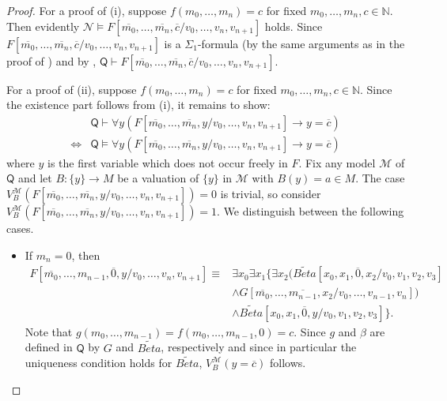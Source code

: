 \begin{proof}
For a proof of (i), suppose $f(m_0, \ldots, m_n) = c$ for fixed $m_0, \ldots, m_n,c \in \mathbb{N}$. Then evidently $\mathcal{N} \vDash F[\overline{m_0}, \ldots, \overline{m_n},\overline{c}/v_0, \ldots, v_n,v_{n+1}]$ holds. Since \sloppy $F[\overline{m_0}, \ldots, \overline{m_n},\overline{c}/v_0, \ldots, v_n,v_{n+1}]$ is a $\Sigma_1$-formula (by the same arguments as in the proof of ) and by , $\mathsf{Q} \vdash F[\overline{m_0}, \ldots, \overline{m_n},\overline{c}/v_0, \ldots, v_n,v_{n+1}]$.

For a proof of (ii), suppose $f(m_0, \ldots, m_n) = c$ for fixed $m_0, \ldots, m_n,c \in \mathbb{N}$. Since the existence part follows from (i), it remains to show:
\begin{align*}
&\mathsf{Q} \vdash \forall y (F[\overline{m_0}, \ldots, \overline{m_n},y/v_0, \ldots, v_n,v_{n+1}] \rightarrow y = \overline{c}) \\
\Leftrightarrow &\mathsf{Q} \vDash \forall y (F[\overline{m_0}, \ldots, \overline{m_n},y/v_0, \ldots, v_n,v_{n+1}] \rightarrow y = \overline{c})
\end{align*}  
where $y$ is the first variable which does not occur freely in $F$. Fix any model $\mathcal{M}$ of $\mathsf{Q}$ and let $B:\lbrace y \rbrace \rightarrow M$ be a valuation of $\lbrace y \rbrace$ in $\mathcal{M}$ with $B(y) = a \in M$. The case $V_B^\mathcal{M}( F[\overline{m_0}, \ldots, \overline{m_n},y/v_0, \ldots, v_n,v_{n+1}] ) = 0 $ is trivial, so consider $V_B^\mathcal{M}( F[\overline{m_0}, \ldots, \overline{m_n},y/v_0, \ldots, v_n,v_{n+1}] ) = 1 $. We distinguish between the following cases.
\begin{itemize}
\item If $m_n=0$, then
\begin{align*}
F[\overline{m_0}, \ldots, m_{n-1},\overline{0},y/v_0, \ldots, v_n,v_{n+1}] \equiv&\exists x_0 \exists x_1 \lbrace \exists x_2  (\mathit{\widetilde{Beta}}[x_0,x_1,\overline{0},x_2/v_0,v_1,v_2,v_3]\\
&\wedge G[\overline{m_0}, \ldots, \overline{m_{n-1}},x_2/v_0, \ldots, v_{n-1},v_{n}] ) \\
& \wedge \mathit{\widetilde{Beta}}[x_0,x_1,\overline{0},y/v_0,v_1,v_2,v_3]\rbrace. 
\end{align*}  
Note that $g(m_0, \ldots,m_{n-1}) = f(m_0, \ldots,m_{n-1},0) = c$. 
Since $g$ and $\beta$ are defined in $\mathsf{Q}$ by $G$ and $\mathit{\widetilde{Beta}}$, respectively and since in particular the uniqueness condition holds for $\mathit{\widetilde{Beta}}$, $V_B^\mathcal{M}(y= \overline{c})$ follows.

\end{itemize}
\end{proof}
